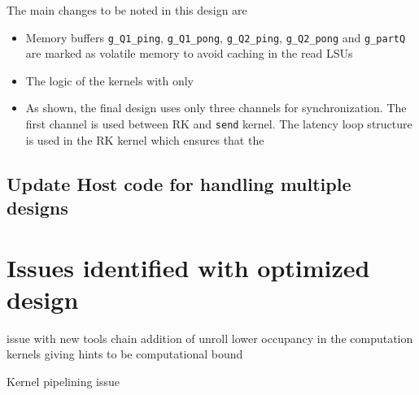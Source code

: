 The main changes to be noted in this design are

\begin{itemize}
\item Memory buffers \texttt{g\_Q1\_ping}, \texttt{g\_Q1\_pong}, \texttt{g\_Q2\_ping},
\texttt{g\_Q2\_pong} and \texttt{g\_partQ} are marked as volatile memory to avoid
caching in the read \ac{LSU}s
\item The logic of the kernels with only
\item As shown, the final design uses only three channels for synchronization.
The first channel is used between RK and \texttt{send} kernel. The latency
loop structure is used in the RK kernel which ensures that the \texttt{}
\end{itemize}




\subsection{Update Host code for handling multiple designs}

\section{Issues identified with optimized design}

issue with new tools chain
addition of unroll
lower occupancy in the computation kernels giving hints to be computational
bound

Kernel pipelining issue
